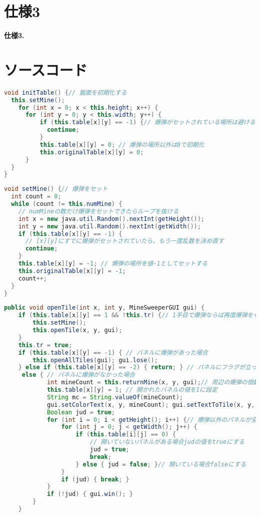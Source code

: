 \documentclass[a4j,11pt]{jsarticle}
\begin{document}
\section*{仕様3}
\setcounter{section}{3}
\setcounter{subsection}{0}
\setcounter{lstlisting}{0}
\begin{screen}
    \textbf{仕様3.}\\
\end{screen}
\newpage
\section*{ソースコード}
\lstset{frame=shadowbox,numbers=left}
\begin{lstlisting}[caption=\ttfamily initTable, label=src:initTable, language=Java]
void initTable() {// 盤面を初期化する
  this.setMine();
    for (int x = 0; x < this.height; x++) {
      for (int y = 0; y < this.width; y++) {
          if (this.table[x][y] == -1) {// 爆弾がセットされている場所は避ける
            continue;
          }
          this.table[x][y] = 0; // 爆弾の場所以外は0で初期化
          this.originalTable[x][y] = 0;
      }
  }
}
\end{lstlisting}
\begin{lstlisting}[caption=\ttfamily setMine, label=src:setMine, language=Java]
void setMine() {// 爆弾をセット
  int count = 0;
  while (count != this.numMine) {
    // numMineの数だけ爆弾をセットできたらループを抜ける
    int x = new java.util.Random().nextInt(getHeight());
    int y = new java.util.Random().nextInt(getWidth());
    if (this.table[x][y] == -1) {
      // [x][y]にすでに爆弾がセットされていたら、もう一度乱数を決め直す
      continue;
    }
    this.table[x][y] = -1; // 爆弾の場所を値-1としてセットする
    this.originalTable[x][y] = -1;
    count++;
  }
}
\end{lstlisting}
\begin{lstlisting}[caption=\ttfamily openTile, label=src:openTile, language=Java]
public void openTile(int x, int y, MineSweeperGUI gui) {
    if (this.table[x][y] == 1 && !this.tr) {// 1手目で爆弾ならば再度爆弾をセット
        this.setMine();
        this.openTile(x, y, gui);
    }
    this.tr = true;
    if (this.table[x][y] == -1) { // パネルに爆弾があった場合
        this.openAllTiles(gui); gui.lose();
	} else if (this.table[x][y] == -2) { return; } // パネルにフラグが立っている場合
     else { // パネルに爆弾がなかった場合
			int mineCount = this.returnMine(x, y, gui);// 周辺の爆弾の個数を調査
			this.table[x][y] = 1; // 開かれたパネルの値を1に設定
			String mc = String.valueOf(mineCount);
			gui.setColorText(x, y, mineCount); gui.setTextToTile(x, y, mc); 
            Boolean jud = true;
			for (int i = 0; i < getHeight(); i++) {// 爆弾以外のパネルが全て開いているか確認
				for (int j = 0; j < getWidth(); j++) {
					if (this.table[i][j] == 0) {
						// 開いていないパネルがある場合judの値をtrueにする
						jud = true;
						break;
					} else { jud = false; }// 開いている場合falseにする
				}
				if (jud) { break; }
			}
			if (!jud) { gui.win(); }
		}
	}
\end{lstlisting}
\end{document}
